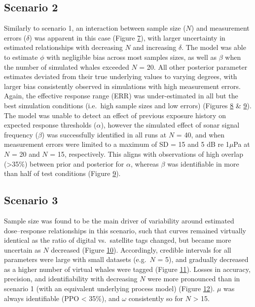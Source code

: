 \documentclass[
]{article}
\begin{document}
\subsection{Scenario 2}
\hypertarget{section52}{}

Similarly to scenario 1, an interaction between sample size (\(N\)) and measurement errors (\(\delta\)) was apparent in this case (Figure \hyperlink{fig7}{7}), with larger uncertainty in estimated relationships with decreasing \(N\) and increasing \(\delta\). The model was able to estimate \(\phi\) with negligible bias across most samples sizes, as well as \(\beta\) when the number of simulated whales exceeded \(N\) = 20. All other posterior parameter estimates deviated from their true underlying values to varying degrees, with larger bias consistently observed in simulations with high measurement errors. Again, the effective response range (ERR) was under-estimated in all but the best simulation conditions (i.e.~high sample sizes and low errors) (Figures \hyperlink{fig8}{8} \& \hyperlink{fig9}{9}). The model was unable to detect an effect of previous exposure history on expected response thresholds (\(\alpha\)), however the simulated effect of sonar signal frequency (\(\beta\)) was successfully identified in all runs at \(N\) = 40, and when measurement errors were limited to a maximum of SD = 15 and 5 dB re 1\(\mu\)Pa at \(N\) = 20 and \(N\) = 15, respectively. This aligns with observations of high overlap (\textgreater35\%) between prior and posterior for \(\alpha\), whereas \(\beta\) was identifiable in more than half of test conditions (Figure \hyperlink{fig9}{9}).

\subsection{Scenario 3}

Sample size was found to be the main driver of variability around estimated dose--response relationships in this scenario, such that curves remained virtually identical as the ratio of digital vs.~satellite tags changed, but became more uncertain as \(N\) decreased (Figure \hyperlink{fig10}{10}). Accordingly, credible intervals for all parameters were large with small datasets (e.g.~\(N\) = 5), and gradually decreased as a higher number of virtual whales were tagged (Figure \hyperlink{fig11}{11}). Losses in accuracy, precision, and identifiability with decreasing \(N\) were more pronounced than in scenario 1 (with an equivalent underlying process model) (Figure \hyperlink{fig12}{12}). \(\mu\) was always identifiable (PPO \textless{} 35\%), and \(\omega\) consistently so for \(N\) \textgreater{} 15.
\end{document}

